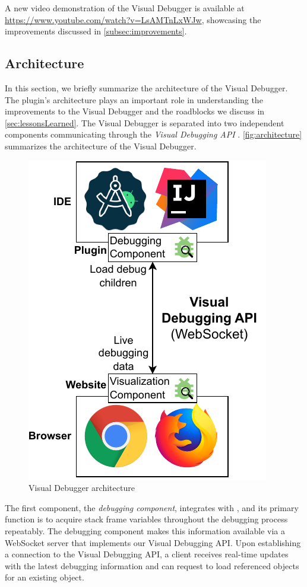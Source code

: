 \documentclass[sigconf]{acmart}
\begin{document}
A new video demonstration of the Visual Debugger is available at \url{https://www.youtube.com/watch?v=LsAMTnLxWJw}, showcasing the improvements discussed in \autoref{subsec:improvements}.

\subsection{Architecture}
In this section, we briefly summarize the architecture of the Visual Debugger.
The plugin's architecture plays an important role in understanding the improvements to the Visual Debugger and the roadblocks we discuss in \autoref{sec:lessonsLearned}.
The Visual Debugger is separated into two independent components communicating through the \textit{Visual Debugging API} \cite{krauterVisualDebuggerTool2022}.
\autoref{fig:architecture} summarizes the architecture of the Visual Debugger.

\begin{figure}[ht]
  \centering
  \includegraphics[width=0.62\linewidth]{images/visual-debugger-architecture.pdf}
  \caption{Visual Debugger architecture}
  \label{fig:architecture}
\end{figure}

The first component, the \textit{debugging component}, integrates with \intellij{}, and its primary function is to acquire stack frame variables throughout the debugging process repeatably.
The debugging component makes this information available via a WebSocket server that implements our Visual Debugging API.
Upon establishing a connection to the Visual Debugging API, a client receives real-time updates with the latest debugging information and can request to load referenced objects for an existing object.
\end{document}
